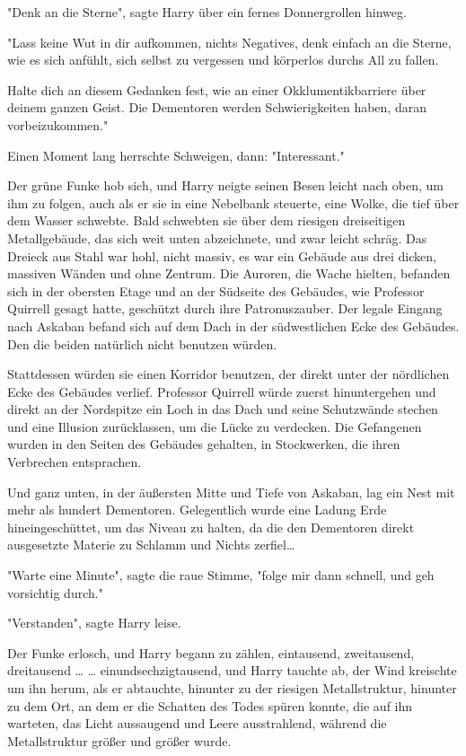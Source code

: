 {"Denk an die Sterne", sagte Harry über ein fernes Donnergrollen hinweg.

"Lass keine Wut in dir aufkommen, nichts Negatives, denk einfach an die Sterne, wie es sich anfühlt, sich selbst zu vergessen und körperlos durchs All zu fallen.

Halte dich an diesem Gedanken fest, wie an einer Okklumentikbarriere über deinem ganzen Geist. Die Dementoren werden Schwierigkeiten haben, daran vorbeizukommen."

Einen Moment lang herrschte Schweigen, dann: "Interessant."

Der grüne Funke hob sich, und Harry neigte seinen Besen leicht nach oben, um ihm zu folgen, auch als er sie in eine Nebelbank steuerte, eine Wolke, die tief über dem Wasser schwebte. Bald schwebten sie über dem riesigen dreiseitigen Metallgebäude, das sich weit unten abzeichnete, und zwar leicht schräg. Das Dreieck aus Stahl war hohl, nicht massiv, es war ein Gebäude aus drei dicken, massiven Wänden und ohne Zentrum. Die Auroren, die Wache hielten, befanden sich in der obersten Etage und an der Südseite des Gebäudes, wie Professor Quirrell gesagt hatte, geschützt durch ihre Patronuszauber. Der legale Eingang nach Askaban befand sich auf dem Dach in der südwestlichen Ecke des Gebäudes. Den die beiden natürlich nicht benutzen würden.

Stattdessen würden sie einen Korridor benutzen, der direkt unter der nördlichen Ecke des Gebäudes verlief. Professor Quirrell würde zuerst hinuntergehen und direkt an der Nordspitze ein Loch in das Dach und seine Schutzwände stechen und eine Illusion zurücklassen, um die Lücke zu verdecken. Die Gefangenen wurden in den Seiten des Gebäudes gehalten, in Stockwerken, die ihren Verbrechen entsprachen.

Und ganz unten, in der äußersten Mitte und Tiefe von Askaban, lag ein Nest mit mehr als hundert Dementoren. Gelegentlich wurde eine Ladung Erde hineingeschüttet, um das Niveau zu halten, da die den Dementoren direkt ausgesetzte Materie zu Schlamm und Nichts zerfiel…

"Warte eine Minute", sagte die raue Stimme, "folge mir dann schnell, und geh vorsichtig durch."

"Verstanden", sagte Harry leise.

Der Funke erlosch, und Harry begann zu zählen, eintausend, zweitausend, dreitausend … … einundsechzigtausend, und Harry tauchte ab, der Wind kreischte um ihn herum, als er abtauchte, hinunter zu der riesigen Metallstruktur, hinunter zu dem Ort, an dem er die Schatten des Todes spüren konnte, die auf ihn warteten, das Licht aussaugend und Leere ausstrahlend, während die Metallstruktur größer und größer wurde.

}
